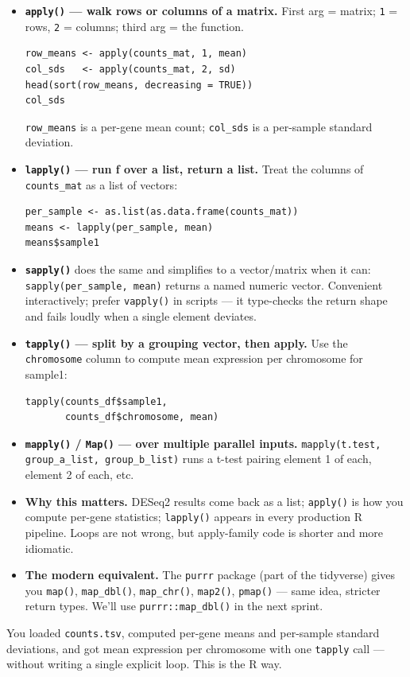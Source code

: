 \begin{itemize}[nosep]
  \item \textbf{\texttt{apply()} --- walk rows or columns of a matrix.} First arg = matrix; \texttt{1} = rows, \texttt{2} = columns; third arg = the function.
    \begin{lstlisting}
row_means <- apply(counts_mat, 1, mean)
col_sds   <- apply(counts_mat, 2, sd)
head(sort(row_means, decreasing = TRUE))
col_sds
    \end{lstlisting}
    \texttt{row\_means} is a per-gene mean count; \texttt{col\_sds} is a per-sample standard deviation.
  \item \textbf{\texttt{lapply()} --- run f over a list, return a list.} Treat the columns of \texttt{counts\_mat} as a list of vectors:
    \begin{lstlisting}
per_sample <- as.list(as.data.frame(counts_mat))
means <- lapply(per_sample, mean)
means$sample1
    \end{lstlisting}
  \item \textbf{\texttt{sapply()}} does the same and simplifies to a vector/matrix when it can: \texttt{sapply(per\_sample, mean)} returns a named numeric vector. Convenient interactively; prefer \texttt{vapply()} in scripts --- it type-checks the return shape and fails loudly when a single element deviates.
  \item \textbf{\texttt{tapply()} --- split by a grouping vector, then apply.} Use the \texttt{chromosome} column to compute mean expression per chromosome for sample1:
    \begin{lstlisting}
tapply(counts_df$sample1,
       counts_df$chromosome, mean)
    \end{lstlisting}
  \item \textbf{\texttt{mapply()} / \texttt{Map()} --- over multiple parallel inputs.} \texttt{mapply(t.test, group\_a\_list, group\_b\_list)} runs a t-test pairing element 1 of each, element 2 of each, etc.
  \item \textbf{Why this matters.} DESeq2 results come back as a list; \texttt{apply()} is how you compute per-gene statistics; \texttt{lapply()} appears in every production R pipeline. Loops are not wrong, but apply-family code is shorter and more idiomatic.
  \item \textbf{The modern equivalent.} The \texttt{purrr} package (part of the tidyverse) gives you \texttt{map()}, \texttt{map\_dbl()}, \texttt{map\_chr()}, \texttt{map2()}, \texttt{pmap()} --- same idea, stricter return types. We'll use \texttt{purrr::map\_dbl()} in the next sprint.
\end{itemize}
\begin{winbox}[Checkpoint]
You loaded \texttt{counts.tsv}, computed per-gene means and per-sample standard deviations, and got mean expression per chromosome with one \texttt{tapply} call --- without writing a single explicit loop. This is the R way.
\end{winbox}

